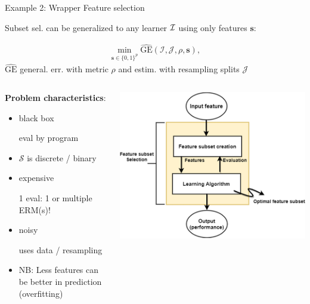 \documentclass[11pt,compress,t,notes=noshow, xcolor=table]{beamer}
\begin{document}
	
\begin{vbframe}{Example 2: Wrapper Feature selection}

Subset sel. can be generalized to any learner $\mathcal{I}$ using only features $\bm{s}$:

\vspace*{-0.4cm}

\begin{eqnarray*}
	\min_{\textbf{s} \in \{0, 1\}^p} \widehat{\text{GE}}(\mathcal{I}, \mathcal{J}, \rho, \bm{s}),
\end{eqnarray*}
$\widehat{\text{GE}}$ general. err. with metric $\rho$ and estim. with resampling splits $\mathcal{J}$

\vspace*{0.3cm}


\begin{columns}
\begin{column}{0.5\textwidth}
\textbf{Problem characteristics}:
\begin{itemize}
\item black box \\
\begin{footnotesize}eval by program\end{footnotesize}
\item $\mathcal{S}$ is discrete / binary
\item expensive \\
\begin{footnotesize}
1 eval: 1 or multiple ERM(s)!
\end{footnotesize}
\item noisy \\
\begin{footnotesize}
uses data / resampling
\end{footnotesize}
\item NB: Less features can be better in prediction (overfitting)
\end{itemize}
\end{column}
\begin{column}{0.5\textwidth}
\begin{center}
\includegraphics[width=1\textwidth]{figure_man/feature_subset_selection.png}

\end{center}
\end{column}
\end{columns}
\end{vbframe}
\end{document}
